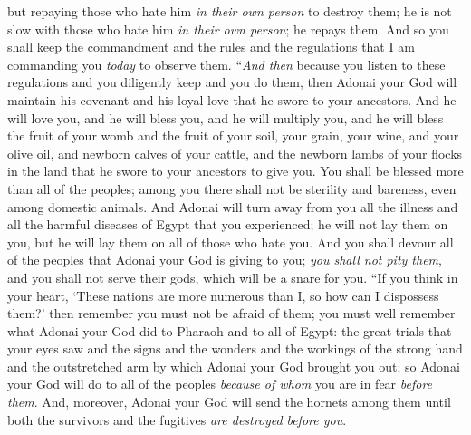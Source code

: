 \begin{biblechapter}
\verse but repaying those who hate him \textit{in their own person} to destroy them; he is not slow with those who hate him \textit{in their own person}; he repays them.
\verse And so you shall keep the commandment and the rules and the regulations that I am commanding you \textit{today} to observe them.
\verse “\textit{And then} because you listen to these regulations and you diligently keep and you do them, then Adonai your God will maintain his covenant and his loyal love that he swore to your ancestors.
\verse And he will love you, and he will bless you, and he will multiply you, and he will bless the fruit of your womb and the fruit of your soil, your grain, your wine, and your olive oil, and newborn calves of your cattle, and the newborn lambs of your flocks in the land that he swore to your ancestors to give you.
\verse You shall be blessed more than all of the peoples; among you there shall not be sterility and bareness, even among domestic animals.
\verse And Adonai will turn away from you all the illness and all the harmful diseases of Egypt that you experienced; he will not lay them on you, but he will lay them on all of those who hate you.
\verse And you shall devour all of the peoples that Adonai your God is giving to you; \textit{you shall not pity them}, and you shall not serve their gods, which will be a snare for you.
\verse “If you think in your heart, ‘These nations are more numerous than I, so how can I dispossess them?’
\verse then remember you must not be afraid of them; you must well remember what Adonai your God did to Pharaoh and to all of Egypt:
\verse the great trials that your eyes saw and the signs and the wonders and the workings of the strong hand and the outstretched arm by which Adonai your God brought you out; so Adonai your God will do to all of the peoples \textit{because of whom} you are in fear \textit{before them}.
\verse And, moreover, Adonai your God will send the hornets among them until both the survivors and the fugitives \textit{are destroyed} \textit{before you}.

\end{biblechapter}
